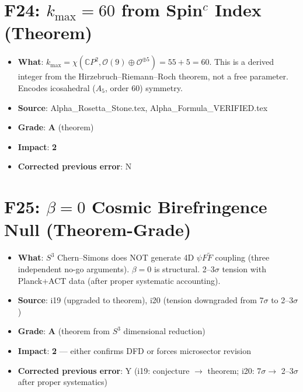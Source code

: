 \documentclass[11pt,a4paper]{article}
\newcommand{\grade}[1]{\textbf{#1}}
\newcommand{\impact}[1]{\textbf{#1}}
\begin{document}
\section{F24: $k_{\max} = 60$ from Spin$^c$ Index (Theorem)}
\begin{itemize}[nosep]
\item \textbf{What}: $k_{\max} = \chi(\mathbb{C}P^2, \mathcal{O}(9) \oplus \mathcal{O}^{\oplus 5}) = 55 + 5 = 60$. This is a derived integer from the Hirzebruch--Riemann--Roch theorem, not a free parameter. Encodes icosahedral ($A_5$, order 60) symmetry.
\item \textbf{Source}: Alpha\_Rosetta\_Stone.tex, Alpha\_Formula\_VERIFIED.tex
\item \textbf{Grade}: \grade{A} (theorem)
\item \textbf{Impact}: \impact{2}
\item \textbf{Corrected previous error}: N
\end{itemize}

\section{F25: $\beta = 0$ Cosmic Birefringence Null (Theorem-Grade)}
\begin{itemize}[nosep]
\item \textbf{What}: $S^3$ Chern--Simons does NOT generate 4D $\psi F\tilde{F}$ coupling (three independent no-go arguments). $\beta = 0$ is structural. 2--3$\sigma$ tension with Planck+ACT data (after proper systematic accounting).
\item \textbf{Source}: i19 (upgraded to theorem), i20 (tension downgraded from 7$\sigma$ to 2--3$\sigma$)
\item \textbf{Grade}: \grade{A} (theorem from $S^3$ dimensional reduction)
\item \textbf{Impact}: \impact{2} --- either confirms DFD or forces microsector revision
\item \textbf{Corrected previous error}: Y (i19: conjecture $\to$ theorem; i20: 7$\sigma \to$ 2--3$\sigma$ after proper systematics)
\end{itemize}


\end{document}
